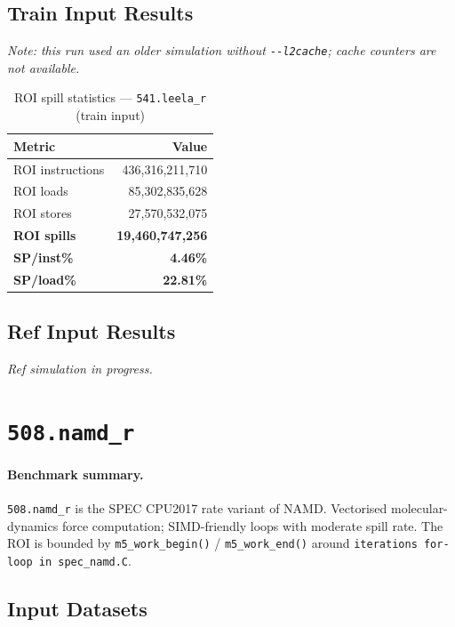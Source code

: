 \documentclass[11pt,a4paper]{article}
\begin{document}
\subsection{Train Input Results}

\textit{Note: this run used an older simulation without \texttt{-{}-l2cache}; cache counters are not available.}


\begin{table}[H]
\centering
\caption{ROI spill statistics --- \texttt{541.leela\_r} (train input)}
\label{tab:leela_train_roi}
\begin{tabular}{lr}
\toprule
\textbf{Metric} & \textbf{Value} \\
\midrule
ROI instructions & 436,316,211,710 \\
ROI loads        & 85,302,835,628 \\
ROI stores       & 27,570,532,075 \\
\textbf{ROI spills}   & \textbf{19,460,747,256} \\
\textbf{SP/inst\%}   & \textbf{4.46\%} \\
\textbf{SP/load\%}   & \textbf{22.81\%} \\
\bottomrule
\end{tabular}
\end{table}

\subsection{Ref Input Results}
\textit{Ref simulation in progress.}



\section{\texttt{508.namd\_r}}
\label{sec:namd}

\paragraph{Benchmark summary.}
\texttt{508.namd\_r} is the SPEC CPU2017 rate variant of NAMD.
Vectorised molecular-dynamics force computation; SIMD-friendly loops with moderate spill rate.
The ROI is bounded by \texttt{m5\_work\_begin()} / \texttt{m5\_work\_end()}
around \texttt{iterations for-loop in spec\_namd.C}.

\subsection{Input Datasets}
\end{document}
